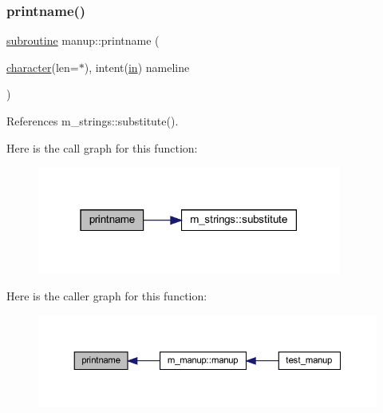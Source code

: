 \subsubsection{\texorpdfstring{printname()}{printname()}}
{\footnotesize\ttfamily \hyperlink{M__stopwatch_83_8txt_acfbcff50169d691ff02d4a123ed70482}{subroutine} manup\+::printname (\begin{DoxyParamCaption}\item[{\hyperlink{option__stopwatch_83_8txt_abd4b21fbbd175834027b5224bfe97e66}{character}(len=$\ast$), intent(\hyperlink{M__journal_83_8txt_afce72651d1eed785a2132bee863b2f38}{in})}]{nameline }\end{DoxyParamCaption})}



References m\+\_\+strings\+::substitute().

Here is the call graph for this function\+:
\nopagebreak
\begin{figure}[H]
\begin{center}
\leavevmode
\includegraphics[width=283pt]{manup_8f90_a12de453acb5b104d198da168695af410_cgraph}
\end{center}
\end{figure}
Here is the caller graph for this function\+:
\nopagebreak
\begin{figure}[H]
\begin{center}
\leavevmode
\includegraphics[width=350pt]{manup_8f90_a12de453acb5b104d198da168695af410_icgraph}
\end{center}
\end{figure}
\mbox{\label{manup_8f90_aabf73d1c2ef02028690008788b8a1f9d}} 
